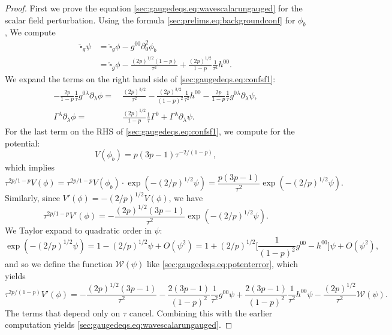 \documentclass{article}
\newcommand{\mc}{\mathcal}
\newcommand{\wh}{\widehat}
\newcommand{\pa}{\partial}
\begin{document}
\begin{proof}
    First we prove the equation \eqref{sec:gaugedeqs.eq:wavescalarungauged} for the scalar field perturbation. Using the formula \eqref{sec:prelims.eq:backgroundconf} for $\phi_b$, We compute
    \begin{align}
        \wh{\square}_g \psi &= \wh{\square}_g\phi - g^{00}\pa_0^2\phi_b\nonumber\\
        &=\wh{\square}_g\phi - \frac{(2p)^{1/2}(1-p)}{\tau^2} + \frac{(2p)^{1/2}}{1-p}\frac{1}{\tau^2} h^{00}.
    \end{align}
    We expand the terms on the right hand side of \eqref{sec:gaugedeqs.eq:confsf1}:
    \begin{subequations}
        \begin{align}
            -\frac{2p}{1-p}\frac{1}{\tau}g^{0\lambda}\pa_\lambda \phi =&\>\frac{(2p)^{3/2}}{\tau^2} - \frac{(2p)^{3/2}}{(1-p)^2}\frac{1}{\tau^2} h^{00} - \frac{2p}{1-p}\frac{1}{\tau}g^{0\lambda}\pa_\lambda\psi,\\
            \Gamma^\lambda \pa_\lambda \phi =&\> \frac{(2p)^{1/2}}{1-p}\frac{1}{\tau}\Gamma^0 + \Gamma^\lambda \pa_\lambda \psi.
        \end{align}
    \end{subequations}
    For the last term on the RHS of \eqref{sec:gaugedeqs.eq:confsf1}, we compute for the potential:
    \begin{equation}
        V(\phi_b) = p(3p-1)\tau^{-2/(1-p)},
    \end{equation}
    which implies
    \begin{equation}
        \tau^{2p/1-p}V(\phi) = \tau^{2p/1-p}V(\phi_b)\cdot\exp(-(2/p)^{1/2}\psi) = \frac{p(3p-1)}{\tau^2}\exp(-(2/p)^{1/2}\psi).
    \end{equation}
    Similarly, since $V'(\phi) = -(2/p)^{1/2}V(\phi)$, we have
    \begin{equation}
        \tau^{2p/1-p}V'(\phi) = -\frac{(2p)^{1/2}(3p-1)}{\tau^2}\exp(-(2/p)^{1/2}\psi).
    \end{equation}
    We Taylor expand to quadratic order in $\psi$:
    \begin{equation}
        \exp(-(2/p)^{1/2}\psi) = 1 - (2/p)^{1/2}\psi + O(\psi^2) = 1 + (2/p)^{1/2}\Big[\frac{1}{(1-p)^2}g^{00} - h^{00}\Big]\psi + O(\psi^2),
    \end{equation}
    and so we define the function $\mc{W}(\psi)$ like \eqref{sec:gaugedeqs.eq:potenterror}, which yields
    \begin{equation}
        \tau^{2p/(1-p)}V'(\phi) = - \frac{(2p)^{1/2}(3p-1)}{\tau^2}-\frac{2(3p-1)}{(1-p)^2}\frac{1}{\tau^2}g^{00}\psi +\frac{2(3p-1)}{(1-p)^2}\frac{1}{\tau^2} h^{00}\psi -\frac{(2p)^{1/2}}{\tau^2}\mc{W}(\psi).
    \end{equation}
    The terms that depend only on $\tau$ cancel. Combining this with the earlier computation yields \eqref{sec:gaugedeqs.eq:wavescalarungauged}.
    

\end{proof}
\end{document}
